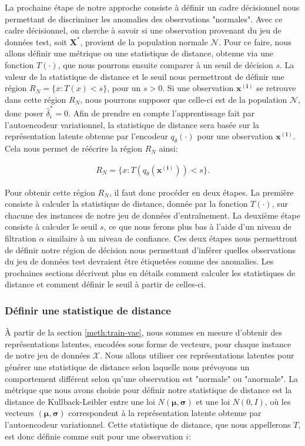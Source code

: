 La prochaine étape de notre approche consiste à définir un cadre décisionnel nous permettant de discriminer les anomalies des observations "normales". Avec ce cadre décisionnel, on cherche à savoir si une observation provenant du jeu de données test, soit $\boldsymbol{X}^{*}$, provient de la population normale $\mathcal{N}$. Pour ce faire, nous allons définir une métrique ou une statistique de distance, obtenue via une fonction $T(\cdot)$, que nous pourrons ensuite comparer à un seuil de décision $s$. La valeur de la statistique de distance et le seuil nous permettront de définir une région $R_{N}=\{x :T(x)<s\}$, pour un $s>0$. Si une observation $\boldsymbol{x^{(i)}}$ se retrouve dans cette région $R_{N}$, nous pourrons supposer que celle-ci est de la population $\mathcal{N}$, donc poser $\hat{\delta}^{*}_{i}=0$. Afin de prendre en compte l'apprentissage fait par l'autoencodeur variationnel, la statistique de distance sera basée sur la représentation latente obtenue par l'encodeur $q_\theta(\cdot)$ pour une observation $\boldsymbol{x^{(i)}}$. Cela nous permet de réécrire la région $R_N$ ainsi:

\begin{gather*}  \label{eq:region}
R_{N}=\{x :T(q_\theta(\boldsymbol{x^{(i)}}))<s\}.
\end{gather*}

Pour obtenir cette région $R_N$, il faut donc procéder en deux étapes. La première consiste à calculer la statistique de distance, donnée par la fonction $T(\cdot)$, sur chacune des instances de notre jeu de données d'entraînement. La deuxième étape consiste à calculer le seuil $s$, ce que nous ferons plus bas à l'aide d'un niveau de filtration $\alpha$ similaire à un niveau de confiance. Ces deux étapes nous permettront de définir notre région de décision nous permettant d'inférer quelles observations du jeu de données test devraient être étiquetées comme des anomalies. Les prochaines sections décrivent plus en détails comment calculer les statistiques de distance et comment définir le seuil à partir de celles-ci.

\subsubsection{Définir une statistique de distance}

 À partir de la section \ref{meth:train-vae}, nous sommes en mesure d'obtenir des représentations latentes, encodées sous forme de vecteurs, pour chaque instance de notre jeu de données $\mathcal{X}$. Nous allons utiliser ces représentations latentes pour générer une statistique de distance selon laquelle nous prévoyons un comportement différent selon qu'une observation est "normale" ou "anormale". La métrique que nous avons choisie pour définir notre statistique de distance est la distance de Kullback-Leibler entre une loi $N(\boldsymbol{\mu}, \boldsymbol{\sigma})$ et une loi $N(0,I)$, où les vecteurs $(\boldsymbol{\mu}, \boldsymbol{\sigma})$ correspondent à la représentation latente obtenue par l'autoencodeur variationnel. Cette statistique de distance, que nous appellerons $T$, est donc définie comme suit pour une observation $i$:
 

